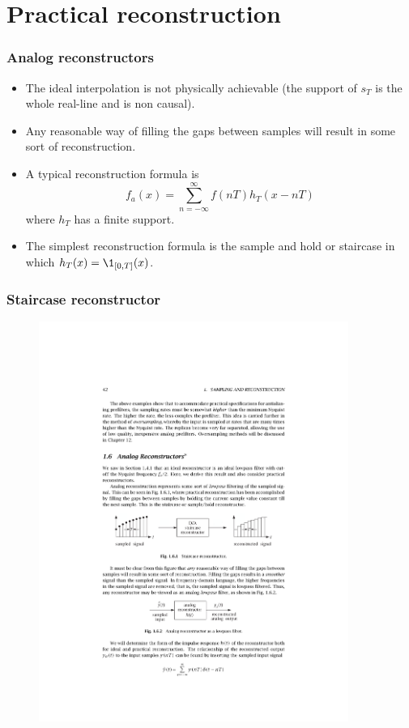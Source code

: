 \section{Practical reconstruction}
\begin{frame}
\frametitle{Analog reconstructors}
\begin{itemize}
\item The ideal interpolation is not physically achievable (the support of $s_T$ is the whole real-line and is non causal).
\item Any reasonable way of \alert{filling the gaps} between samples will result in some sort of reconstruction.
\item A typical reconstruction formula is
\alert{
\[
f_a(x)= \sum_{n=-\infty}^\infty f(nT) h_T(x-nT)
\]
}
where $h_T$ has a \alert{finite support}.
\item The simplest reconstruction formula is the \alert{sample and hold} or \alert{staircase} in which $h_T(x)= \1_{[0,T]}(x)$.
\end{itemize}
\end{frame}

\begin{frame}
\frametitle{Staircase reconstructor}
\begin{figure}
  \centering
  \includegraphics[width=0.9\textwidth]{staircase}\\
\end{figure}

\end{frame}

